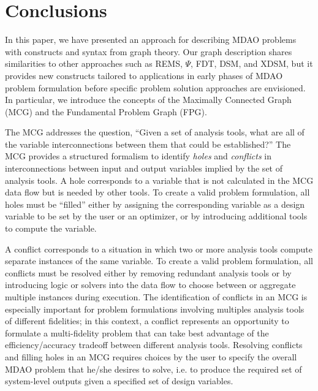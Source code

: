 \section*{Conclusions}
In this paper, we have presented an approach for describing MDAO problems with constructs and syntax from graph theory.  
Our graph description shares similarities to other approaches such as REMS, $\Psi$, FDT, DSM, and XDSM, but it provides new constructs tailored to applications in early phases of MDAO problem formulation before specific problem solution approaches are envisioned.  
In particular, we introduce the concepts of the Maximally Connected Graph (MCG) and the Fundamental Problem Graph (FPG).  

The MCG addresses the question, ``Given a set of analysis tools, what are all of the variable interconnections between them that could be established?''  
The MCG provides a structured formalism to identify \textit{holes} and \textit{conflicts} in interconnections between input and output variables implied by the set of analysis tools.  
A hole corresponds to a variable that is not calculated in the MCG data flow but is needed by other tools.   
To create a valid problem formulation, all holes must be ``filled'' either by assigning the corresponding variable as a design variable to be set by the user or an optimizer, or by introducing additional tools to compute the variable.  

A conflict corresponds to a situation in which two or more analysis tools compute separate instances of the same variable.  
To create a valid problem formulation, all conflicts must be resolved either by removing redundant analysis tools or by introducing logic or solvers into the data flow to choose between or aggregate multiple instances during execution.  
The identification of conflicts in an MCG is especially important for problem formulations involving multiples analysis tools of different fidelities; in this context, a conflict represents an opportunity to formulate a multi-fidelity problem that can take best advantage of the efficiency/accuracy tradeoff between different analysis tools.  
Resolving conflicts and filling holes in an MCG requires choices by the user to specify the overall MDAO problem that he/she desires to solve, i.e. to produce the required set of system-level outputs given a specified set of design variables. 

